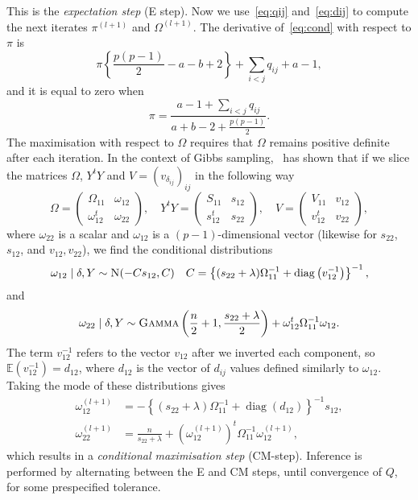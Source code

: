 \documentclass[a4paper, 11pt, oneside]{report}
\DeclareMathOperator{\diag}{diag}
\newcommand{\E}{\mathbb{E}}
\newcommand{\1}{\mathds{1}}
\newcommand{\inv}{^{-1}}
\newcommand{\Nor}{\textsc{N}}
\begin{document}
This is the \emph{expectation step} (E step).
Now we use~\eqref{eq:qij} and~\eqref{eq:dij} to compute the next iterates $\pi^{(l+1)}$ and $\Omega^{(l+1)}$.
The derivative of~\eqref{eq:cond} with respect to $\pi$ is
\[\pi\left\{\frac{p(p-1)}{2} - a - b + 2\right\} + \sum_{i<j} q_{ij} + a - 1,\]
and it is equal to zero when \[\pi = \frac{a-1 + \sum_{i<j}q_{ij}}{a + b - 2 +
	\frac{p(p-1)}{2}}.\]
The maximisation with respect to $\Omega$ requires that $\Omega$ remains positive definite
after each iteration. In the context of Gibbs sampling,~\citet{wang-2015} has shown that if we
slice the matrices $\Omega$, $Y^t Y$ and $V = {(v_{\delta_{ij}})}_{ij}$ in the following way
\[\Omega = \begin{pmatrix}
		\Omega_{11}   & \omega_{12} \\
		\omega_{12}^t & \omega_{22}
	\end{pmatrix},
	\quad
	Y^t Y = \begin{pmatrix}
		S_{11}   & s_{12} \\
		s_{12}^t & s_{22}
	\end{pmatrix},
	\quad
	V = \begin{pmatrix}
		V_{11}   & v_{12} \\
		v_{12}^t & v_{22}
	\end{pmatrix},
\]
where $\omega_{22}$ is a scalar and $\omega_{12}$ is a $(p-1)$-dimensional
vector (likewise for $s_{22}$, $s_{12}$, and $v_{12}, v_{22}$), we find the
conditional distributions
\[
	\omega_{12} \mid \delta, Y \sim \Nor(-C s_{12}, C) \quad C=\left\{(s_{22} +
	\lambda) \Omega_{11}^{-1} + \diag\left(v_{12}^{-1}\right)\right\}\inv,
\]
and
\[\omega_{22} \mid \delta , Y \sim \textsc{Gamma}\left(\frac{n}{2} + 1, \frac{s_{22} +
		\lambda}{2}\right) + \omega_{12}^t\Omega_{11}^{-1}\omega_{12}.\]
The term $v_{12}^{-1}$ refers to the vector $v_{12}$ after we inverted each
component, so $\E\left(v_{12}^{-1}\right) = d_{12}$, where $d_{12}$ is the
vector of $d_{ij}$ values defined similarly to $\omega_{12}$.
Taking the mode of these distributions gives
\begin{align*}
	\omega_{12}^{(l+1)} & = -{\left\{(s_{22} + \lambda) \Omega_{11}^{-1} + \diag(d_{12})\right\}^{-1}} s_{12},                   \\
	\omega_{22}^{(l+1)} & = \frac{n}{s_{22} + \lambda} + \left(\omega_{12}^{(l+1)}\right)^t \Omega_{11}^{-1}\omega_{12}^{(l+1)},
\end{align*}
which results in a \emph{conditional maximisation step} (CM-step).
Inference is performed by alternating between the E and CM steps, until convergence of $Q$, for some prespecified tolerance.
\end{document}
